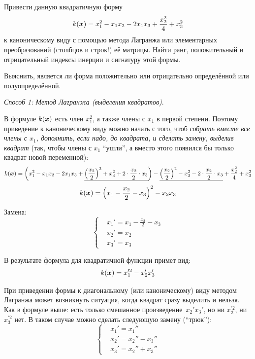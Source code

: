 \documentclass[a4paper,12pt]{article}
\begin{document}
  Привести данную квадратичную форму
  \[
    k(\boldsymbol x) = x_1^2 - x_1 x_2 - 2 x_1 x_3 + \frac{x_2^2}{4} + x_3^2
  \]
  к каноническому виду с помощью метода Лагранжа или элементарных преобразований (столбцов и строк!) её матрицы.
  Найти ранг, положительный и отрицательный индексы инерции и сигнатуру этой формы.

  Выяснить, является ли форма положительно или отрицательно определённой или полуопределённой.
  
  \begin{solution}
    {}\hfill\par
    
    \emph{Способ 1: Метод Лагранжа (выделения квадратов)}.

    В формуле $k(\boldsymbol x)$ есть член $x_1^2$, а также члены с $x_1$ в первой степени.
    Поэтому приведение к каноническому виду можно начать с того, чтоб \emph{собрать вместе все члены с $x_1$, дополнить, если надо, до квадрата, и сделать замену, выделив квадрат} (так, чтобы члены с $x_1$ ``ушли'', а вместо этого появился бы только квадрат новой переменной):
    \[
      k(\boldsymbol x) = \left(x_1^2 - x_1 x_2 - 2 x_1 x_3 + \underline{\left(\frac{x_2}{2}\right)^2 + x_3^2 + 2 \cdot \frac{x_2}{2} \cdot x_3}\right) - \underline{\left(\frac{x_2}{2}\right)^2 - x_3^2 - 2 \cdot \frac{x_2}{2} \cdot x_3} + \frac{x_2^2}{4} + x_3^2
    \]
    \[
      k(\boldsymbol x) = \left(x_1 - \frac{x_2}{2} - x_3\right)^2 - x_2 x_3
    \]
    
    Замена:
    \begin{equation}\label{eq:p1-var-change1}
      \left\{
        \begin{aligned}
          &x_1' = x_1 - \frac{x_2}{2} - x_3\\
          &x_2' = x_2\\
          &x_3' = x_3
        \end{aligned}
      \right.
    \end{equation}
    
    В результате формула для квадратичной функции примет вид:
    \[
      k(\boldsymbol x) = x_1^{\prime 2} - x_2' x_3'
    \]
    
    При приведении формы к диагональному (или каноническому) виду методом Лагранжа может возникнуть ситуация, когда квадрат сразу выделить и нельзя.
    Как в формуле выше: есть только смешанное произведение~$x_2' x_3'$, но ни $x_2^{\prime 2}$, ни $x_3^{\prime 2}$ нет.
    В таком случае можно сделать следующую замену (``трюк''):
    \begin{equation}\label{eq:p1-var-change2}
      \left\{
        \begin{aligned}
          &x_1' = x_1''\\
          &x_2' = x_2'' - x_3''\\
          &x_3' = x_2'' + x_3''
        \end{aligned}
      \right.
    \end{equation}
    

\end{solution}
\end{document}
